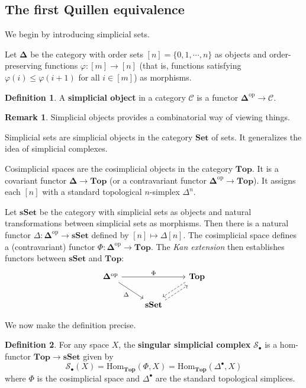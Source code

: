 \documentclass[psamsfonts]{amsart}
\theoremstyle{definition}
\newtheorem{defn}{Definition}[section]
\newtheorem{rem}{Remark}[section]
\newcommand{\Top}{\mathbf{Top}}
\newcommand{\sSet}{\mathbf{sSet}}
\newcommand{\Hom}{\mathrm{Hom}}
\numberwithin{equation}{section}
\begin{document}
\subsection{The first Quillen equivalence}

We begin by introducing simplicial sets.\medbreak

Let $\mathbf{\Delta}$ be the category with order sets $[n]=\{0,1,\cdots,n\}$ as objects and order-preserving functions $\varphi:[m]\to[n]$ (that is, functions satisfying $\varphi(i)\leq\varphi(i+1)$ for all $i\in[m]$)
as morphisms.

\begin{defn}
A \textbf{simplicial object} in a category $\mathcal{C}$ is a functor $\mathbf{\Delta}^\textrm{op}\to\mathcal{C}$.
\end{defn}

\begin{rem}
Simplicial objects provides a combinatorial way of viewing things.

Simplicial sets are simplicial objects in the category $\mathbf{Set}$ of sets. It generalizes the idea of simplicial complexes.

Cosimplicial spaces are the cosimplicial objects in the category $\Top$. It is a covariant functor $\mathbf{\Delta}\to\Top$ (or a contravariant functor $\mathbf{\Delta}^\textrm{op}\to\Top$). It assigns each $[n]$ with a standard topological $n$-simplex $\Delta^n$.
\end{rem}

Let $\sSet$ be the category with simplicial sets as objects and natural transformations between simplicial sets as morphisms. Then there is a natural functor $\Delta:\mathbf{\Delta}^\textrm{op}\to\sSet$ defined by $[n]\mapsto\Delta[n]$. The cosimplicial space defines a (contravariant) functor $\Phi:\mathbf{\Delta}^\textrm{op}\to\Top$. The \textit{Kan extension} then establishes functors between $\sSet$ and $\Top$:
\[\begin{tikzcd}
\mathbf{\Delta}^\textrm{op}\arrow[dr,"\Delta"']\arrow[rr,"\Phi"]&&\Top\arrow[dl,shift right,dashed]\\
&\sSet\arrow[ur,shift right,dashed]
\end{tikzcd}\]

We now make the definition precise.

\begin{defn}
For any space $X$, the \textbf{singular simplicial complex} $\mathcal{S}_\bullet$ is a hom-functor $\Top\to\sSet$ given by
\[\mathcal{S}_\bullet(X)=\Hom_\Top(\Phi,X)=\Hom_\Top(\Delta^\bullet,X)\]
where $\Phi$ is the cosimplicial space and $\Delta^\bullet$ are the standard topological simplices.
\end{defn}
\end{document}
